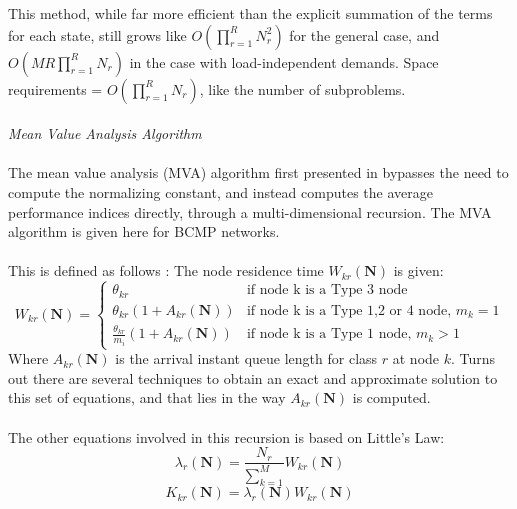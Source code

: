 This method, while far more efficient than the explicit summation of the terms for each state, still grows like \(O(\prod_{r=1}^R N_r^2)\) for the general case, and \(O(MR \prod_{r=1}^R N_r)\) in the case with load-independent demands. Space requirements = \(O(\prod_{r=1}^R N_r)\), like the number of subproblems.
\\\\
\textit{{\large Mean Value Analysis Algorithm}}\\\\
The mean value analysis (MVA) algorithm first presented in \cite{Reiser1980Mean-ValueNetworks} bypasses the need to compute the normalizing constant, and instead computes the average performance indices directly, through a multi-dimensional recursion. The MVA algorithm is given here for BCMP networks.
\\\\
This is defined as follows \cite{Lazowska1984QuantitativeModels}:
The node residence time \(W_{kr}(\mathbf{N})\) is given:
\begin{equation}\label{eq:MVA_step1}
    W_{kr}(\mathbf{N}) = 
    \begin{cases}
        \theta_{kr} & \text{if node k is a Type 3 node}\\
        \theta_{kr}(1 + A_{kr}(\mathbf{N})) & \text{if node k is a Type 1,2 or 4 node, } m_k = 1\\
        \frac{\theta_{kr}}{m_i}(1 + A_{kr}(\mathbf{N})) & \text{if node k is a Type 1 node, } m_k > 1
    \end{cases}
\end{equation}
Where \(A_{kr}(\mathbf{N})\) is the arrival instant queue length for class \(r\) at node \(k\). Turns out there are several techniques to obtain an exact and approximate solution to this set of equations, and that lies in the way \(A_{kr}(\mathbf{N})\) is computed.
\\\\
The other equations involved in this recursion is based on Little's Law:
\begin{equation}\label{eq:MVA_step2}
  \lambda_{r}(\mathbf{N}) = \frac{N_r}{\sum_{k=1}^M} W_{kr}(\mathbf{N})  
\end{equation}
\begin{equation}\label{eq:MVA_step3}
K_{kr}(\mathbf{N}) = \lambda_{r}(\mathbf{N}) W_{kr}(\mathbf{N})
\end{equation}

